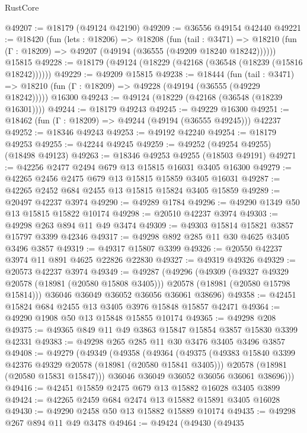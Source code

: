 \begin{lexlean}{RustCore}
\begin{coremodule}
@49207 := @18179 (@49124 @42190)
@49209 := @36556 @49154 @42440
@49221 := @18420
    (fun (lets : @18206) =>
    @18208
      (fun (tail : @3471) =>
      @18210 (fun (Γ : @18209) => @49207 (@49194 (@36555 (@49209 @18240 @18242))))))
    @15815
@49228 := @18179 (@49124 (@18229 (@42168 (@36548 (@18239 (@15816 @18242))))))
@49229 := @49209 @15815
@49238 := @18444
    (fun (tail : @3471) => @18210 (fun (Γ : @18209) => @49228 (@49194 (@36555 (@49229 @18242)))))
    @16300
@49243 := @49124 (@18229 (@42168 (@36548 (@18239 @16301))))
@49244 := @18179 @49243
@49245 := @49229 @16300
@49251 := @18462 (fun (Γ : @18209) => @49244 (@49194 (@36555 @49245))) @42237
@49252 := @18346 @49243
@49253 := @49192 @42240
@49254 := @18179 @49253
@49255 := @42244 @49245
@49259 := @49252 (@49254 @49255) (@18498 @49123)
@49263 := @18346 @49253 @49255 (@18503 @49191)
@49271 := @42256 @2477 @2494 @679 @13 @15815 @16031 @3405 @16300
@49279 := @42265 @2456 @2475 @679 @13 @15815 @15859 @3405 @16031
@49287 := @42265 @2452 @684 @2455 @13 @15815 @15824 @3405 @15859
@49289 := @20497 @42237 @3974
@49290 := @49289 @1784
@49296 := @49290 @1349 @50 @13 @15815 @15822 @10174
@49298 := @20510 @42237 @3974
@49303 := @49298 @263 @894 @11 @49 @3474
@49309 := @49303 @15814 @15821 @3857 @15797 @3399 @42346
@49317 := @49298 @892 @285 @11 @30 @4625 @3405 @3496 @3857
@49319 := @49317 @15807 @3399
@49326 := @20550 @42237 @3974 @11 @891 @4625 @22826 @22830
@49327 := @49319 @49326
@49329 := @20573 @42237 @3974
@49349 := @49287
    (@49296
      (@49309
        (@49327 @49329 @20578 (@18981 (@20580 @15808 @3405)))
        @20578
        (@18981 (@20580 @15798 @15814)))
      @36046
      @36049
      @36052
      @36056
      @36061
      @38696)
@49358 := @42451 @15824 @684 @2455 @13 @3405 @3976 @15848 @15857 @42471
@49364 := @49290 @1908 @50 @13 @15848 @15855 @10174
@49365 := @49298 @208
@49375 := @49365 @849 @11 @49 @3863 @15847 @15854 @3857 @15830 @3399 @42331
@49383 := @49298 @265 @285 @11 @30 @3476 @3405 @3496 @3857
@49408 := @49279
    (@49349
      (@49358
        (@49364
          (@49375
            (@49383 @15840 @3399 @42376 @49329 @20578 (@18981 (@20580 @15841 @3405)))
            @20578
            (@18981 (@20580 @15831 @15847)))
          @36046
          @36049
          @36052
          @36056
          @36061
          @38696)))
@49416 := @42451 @15859 @2475 @679 @13 @15882 @16028 @3405 @3899
@49424 := @42265 @2459 @684 @2474 @13 @15882 @15891 @3405 @16028
@49430 := @49290 @2458 @50 @13 @15882 @15889 @10174
@49435 := @49298 @267 @894 @11 @49 @3478
@49464 := @49424
    (@49430
      (@49435

\end{coremodule}
\end{lexlean}
